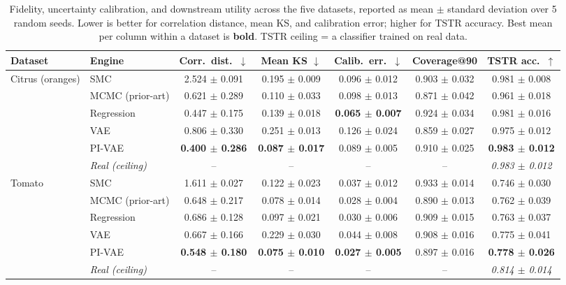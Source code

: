 \begin{table}[t]
\centering
\small
\caption{Fidelity, uncertainty calibration, and downstream utility across the five datasets, reported as mean $\pm$ standard deviation over 5 random seeds. Lower is better for correlation distance, mean KS, and calibration error; higher for TSTR accuracy. Best mean per column within a dataset is \textbf{bold}. TSTR ceiling = a classifier trained on real data.}
\label{tab:main}
\begin{tabular}{ll ccccc}
\toprule
Dataset & Engine & Corr.\ dist.\ $\downarrow$ & Mean KS $\downarrow$ & Calib.\ err.\ $\downarrow$ & Coverage@90 & TSTR acc.\ $\uparrow$ \\
\midrule
Citrus (oranges) & SMC & 2.524 $\pm$ 0.091 & 0.195 $\pm$ 0.009 & 0.096 $\pm$ 0.012 & 0.903 $\pm$ 0.032 & 0.981 $\pm$ 0.008 \\
 & MCMC (prior-art) & 0.621 $\pm$ 0.289 & 0.110 $\pm$ 0.033 & 0.098 $\pm$ 0.013 & 0.871 $\pm$ 0.042 & 0.961 $\pm$ 0.018 \\
 & Regression & 0.447 $\pm$ 0.175 & 0.139 $\pm$ 0.018 & \textbf{0.065 $\pm$ 0.007} & 0.924 $\pm$ 0.034 & 0.981 $\pm$ 0.016 \\
 & VAE & 0.806 $\pm$ 0.330 & 0.251 $\pm$ 0.013 & 0.126 $\pm$ 0.024 & 0.859 $\pm$ 0.027 & 0.975 $\pm$ 0.012 \\
 & PI-VAE & \textbf{0.400 $\pm$ 0.286} & \textbf{0.087 $\pm$ 0.017} & 0.089 $\pm$ 0.005 & 0.910 $\pm$ 0.025 & \textbf{0.983 $\pm$ 0.012} \\
 & \textit{Real (ceiling)} & -- & -- & -- & -- & \textit{0.983 $\pm$ 0.012} \\
\midrule
Tomato & SMC & 1.611 $\pm$ 0.027 & 0.122 $\pm$ 0.023 & 0.037 $\pm$ 0.012 & 0.933 $\pm$ 0.014 & 0.746 $\pm$ 0.030 \\
 & MCMC (prior-art) & 0.648 $\pm$ 0.217 & 0.078 $\pm$ 0.014 & 0.028 $\pm$ 0.004 & 0.890 $\pm$ 0.013 & 0.762 $\pm$ 0.039 \\
 & Regression & 0.686 $\pm$ 0.128 & 0.097 $\pm$ 0.021 & 0.030 $\pm$ 0.006 & 0.909 $\pm$ 0.015 & 0.763 $\pm$ 0.037 \\
 & VAE & 0.667 $\pm$ 0.166 & 0.229 $\pm$ 0.030 & 0.044 $\pm$ 0.008 & 0.908 $\pm$ 0.016 & 0.775 $\pm$ 0.041 \\
 & PI-VAE & \textbf{0.548 $\pm$ 0.180} & \textbf{0.075 $\pm$ 0.010} & \textbf{0.027 $\pm$ 0.005} & 0.897 $\pm$ 0.016 & \textbf{0.778 $\pm$ 0.026} \\
 & \textit{Real (ceiling)} & -- & -- & -- & -- & \textit{0.814 $\pm$ 0.014} \\

\end{tabular}
\end{table}
